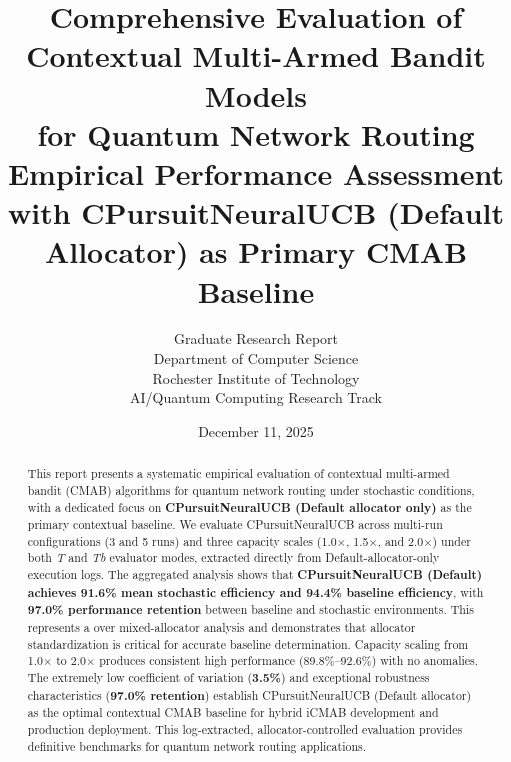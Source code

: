 \documentclass[12pt,a4paper]{article}
\title{\textbf{Comprehensive Evaluation of Contextual Multi-Armed Bandit Models\\for Quantum Network Routing}\\
\large{Empirical Performance Assessment with CPursuitNeuralUCB (Default Allocator) as Primary CMAB Baseline}}
\author{Graduate Research Report\\
Department of Computer Science\\
Rochester Institute of Technology\\
AI/Quantum Computing Research Track}
\date{December 11, 2025}
\newcommand{\primarytext}[1]{\textcolor{primaryblue}{\textbf{#1}}}
\newcommand{\success}[1]{\textcolor{accentgreen}{\textbf{#1}}}
\begin{document}
\maketitle

\begin{abstract}
This report presents a systematic empirical evaluation of contextual multi-armed bandit (CMAB) algorithms for quantum network routing under stochastic conditions, with a dedicated focus on \primarytext{CPursuitNeuralUCB (Default allocator only)} as the primary contextual baseline. We evaluate CPursuitNeuralUCB across multi-run configurations (3 and 5 runs) and three capacity scales (1.0$\times$, 1.5$\times$, and 2.0$\times$) under both \emph{T} and \emph{Tb} evaluator modes, extracted directly from Default-allocator-only execution logs. The aggregated analysis shows that \success{CPursuitNeuralUCB (Default) achieves 91.6\% mean stochastic efficiency and 94.4\% baseline efficiency}, with \success{97.0\% performance retention} between baseline and stochastic environments. This represents a  over mixed-allocator analysis and demonstrates that allocator standardization is critical for accurate baseline determination. Capacity scaling from 1.0$\times$ to 2.0$\times$ produces consistent high performance (89.8\%--92.6\%) with no anomalies. The extremely low coefficient of variation (\success{3.5\%}) and exceptional robustness characteristics (\success{97.0\% retention}) establish CPursuitNeuralUCB (Default allocator) as the optimal contextual CMAB baseline for hybrid iCMAB development and production deployment. This log-extracted, allocator-controlled evaluation provides definitive benchmarks for quantum network routing applications.
\end{abstract}

\newpage
\vspace{0.5cm}
\tableofcontents

\newpage
\end{document}
